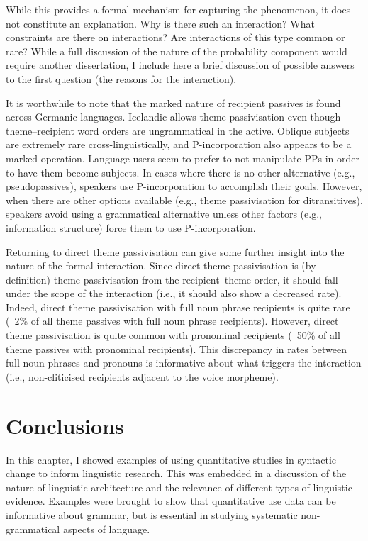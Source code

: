 	While this provides a formal mechanism for capturing the phenomenon, it does not constitute an explanation. Why is there such an interaction? What constraints are there on interactions? Are interactions of this type common or rare? While a full discussion of the nature of the probability component would require another dissertation, I include here a brief discussion of possible answers to the first question (the reasons for the interaction). 

	It is worthwhile to note that the marked nature of recipient passives is found across Germanic languages. Icelandic allows theme passivisation even though theme--recipient word orders are ungrammatical in the active. Oblique subjects are extremely rare cross-linguistically, and P-incorporation also appears to be a marked operation. Language users seem to prefer to not manipulate PPs in order to have them become subjects. In cases where there is no other alternative (e.g., pseudopassives), speakers use P-incorporation to accomplish their goals. However, when there are other options available (e.g., theme passivisation for ditransitives), speakers avoid using a grammatical alternative unless other factors (e.g., information structure) force them to use P-incorporation. 

	Returning to direct theme passivisation can give some further insight into the nature of the formal interaction. Since direct theme passivisation is (by definition) theme passivisation from the recipient--theme order, it should fall under the scope of the interaction (i.e., it should also show a decreased rate). Indeed, direct theme passivisation with full noun phrase recipients is quite rare (~2\% of all theme passives with full noun phrase recipients). However, direct theme passivisation is quite common with pronominal recipients (~50\% of all theme passives with pronominal recipients). This discrepancy in rates between full noun phrases and pronouns is informative about what triggers the interaction (i.e., non-cliticised recipients adjacent to the voice morpheme).

\section{Conclusions}
	In this chapter, I showed examples of using quantitative studies in syntactic change to inform linguistic research. This was embedded in a discussion of the nature of linguistic architecture and the relevance of different types of linguistic evidence. Examples were brought to show that quantitative use data can be informative about grammar, but is essential in studying systematic non-grammatical aspects of language.
	

